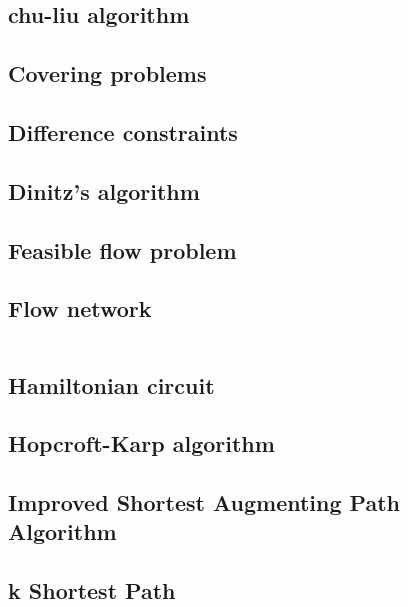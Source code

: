 \documentclass[a4paper,5pt,titlepage]{article}
\begin{document}
\subsection{chu-liu algorithm}

\subsection{Covering problems}

\subsection{Difference constraints}

\subsection{Dinitz's algorithm}

\subsection{Feasible flow problem}

\subsection{Flow network}

\begin{verbatim}

\end{verbatim}

\subsection{Hamiltonian circuit}

\subsection{Hopcroft-Karp algorithm}

\subsection{Improved Shortest Augmenting Path Algorithm}

\subsection{k Shortest Path}

\end{document}
